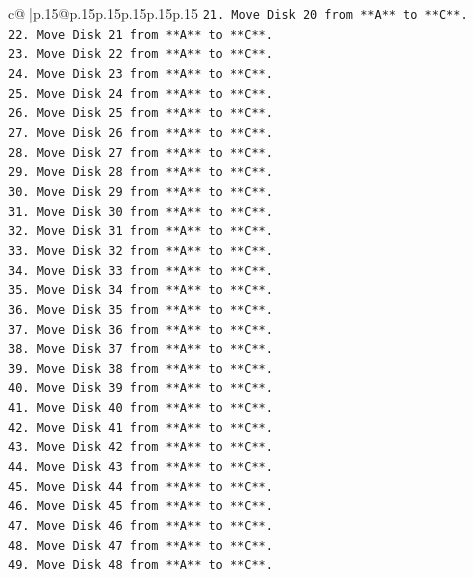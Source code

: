 \documentclass{article}
\begin{document}
{\begin{supertabular}{c@{$\;$}|p{.15\linewidth}@{}p{.15\linewidth}p{.15\linewidth}p{.15\linewidth}p{.15\linewidth}p{.15\linewidth}}
{{{\texttt{21. Move Disk 20 from **A** to **C**.} \\
\texttt{22. Move Disk 21 from **A** to **C**.} \\
\texttt{23. Move Disk 22 from **A** to **C**.} \\
\texttt{24. Move Disk 23 from **A** to **C**.} \\
\texttt{25. Move Disk 24 from **A** to **C**.} \\
\texttt{26. Move Disk 25 from **A** to **C**.} \\
\texttt{27. Move Disk 26 from **A** to **C**.} \\
\texttt{28. Move Disk 27 from **A** to **C**.} \\
\texttt{29. Move Disk 28 from **A** to **C**.} \\
\texttt{30. Move Disk 29 from **A** to **C**.} \\
\texttt{31. Move Disk 30 from **A** to **C**.} \\
\texttt{32. Move Disk 31 from **A** to **C**.} \\
\texttt{33. Move Disk 32 from **A** to **C**.} \\
\texttt{34. Move Disk 33 from **A** to **C**.} \\
\texttt{35. Move Disk 34 from **A** to **C**.} \\
\texttt{36. Move Disk 35 from **A** to **C**.} \\
\texttt{37. Move Disk 36 from **A** to **C**.} \\
\texttt{38. Move Disk 37 from **A** to **C**.} \\
\texttt{39. Move Disk 38 from **A** to **C**.} \\
\texttt{40. Move Disk 39 from **A** to **C**.} \\
\texttt{41. Move Disk 40 from **A** to **C**.} \\
\texttt{42. Move Disk 41 from **A** to **C**.} \\
\texttt{43. Move Disk 42 from **A** to **C**.} \\
\texttt{44. Move Disk 43 from **A** to **C**.} \\
\texttt{45. Move Disk 44 from **A** to **C**.} \\
\texttt{46. Move Disk 45 from **A** to **C**.} \\
\texttt{47. Move Disk 46 from **A** to **C**.} \\
\texttt{48. Move Disk 47 from **A** to **C**.} \\
\texttt{49. Move Disk 48 from **A** to **C**.} \\
}}}
\end{supertabular}}
\end{document}
